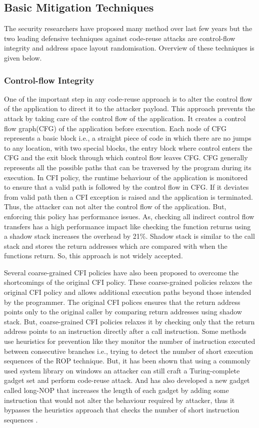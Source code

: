 \documentclass{article}
\begin{document}
\begin{multicols}{2}
	\subsection{Basic Mitigation Techniques}
	The security researchers have proposed many method over last few years but the two leading defensive techniques against code-reuse attacks are control-flow integrity and address space layout randomisation. Overview of these techniques is given below.
	
	\subsubsection{Control-flow Integrity}
	One of the important step in any code-reuse approach is to alter the control flow of the application to direct it to the attacker payload. This approach prevents the attack by taking care of the control flow of the application. It creates a control flow graph(CFG) of the application before execution. Each node of CFG represents a basic block i.e., a straight piece of code in which there are no jumps to any location, with two special blocks, the entry block where control enters the CFG and the exit block through which control flow leaves CFG. CFG generally represents all the possible paths that can be traversed by the program during its execution. In CFI policy, the runtime behaviour of the application is monitored to ensure that a valid path is followed by the control flow in CFG. If it deviates from valid path then a CFI exception is raised and the application is terminated. Thus, the attacker can not alter the control flow of the application. But, enforcing this policy has performance issues. As, checking all indirect control flow transfers has a high performance impact like checking the function returns using a shadow stack increases the overhead by 21\%. Shadow stack is similar to the call stack and stores the return addresses which are compared with when the functions return. So, this approach is not widely accepted.
	
	Several coarse-grained CFI policies have also been proposed to overcome the shortcomings of the original CFI policy. These coarse-grained policies relaxes the original CFI policy and allows additional execution paths beyond those intended by the programmer. The original CFI polices ensures that the return address points only to the original caller by comparing return addresses using shadow stack. But, coarse-grained CFI policies relaxes it by checking only that the return address points to an instruction directly after a call instruction. Some methods use heuristics for prevention like they monitor the number of instruction executed between consecutive branches i.e., trying to detect the number of short execution sequences of the ROP technique. But, it has been shown that using a commonly used system library on windows an attacker can still craft a Turing-complete gadget set and perform code-reuse attack. And has also developed a new gadget called long-NOP that increases the length of each gadget by adding some instruction that would not alter the behaviour required by attacker, thus it bypasses the heuristics approach that checks the number of short instruction sequences \cite{effcfi}.
	

\end{multicols}
\end{document}
